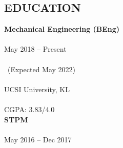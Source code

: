 \documentclass[11pt,A4,english]{article}
\begin{document}
\begin{paracol}{2}
\setlength{\columnsep}{2em}


\begin{leftcolumn}
    \vspace{0em}
    \section{EDUCATION}
        \vspace{0em}
        \begin{addmargin}[0em]{0em}

            {\bfseries Mechanical Engineering (BEng)} \\ \vspace{-.8cm} \\
    
            \hspace{-14pt} \faCalendar \hspace{6pt} May 2018 -- Present \\ \vspace{-.9cm} \\
    
            \hspace{2pt} \ (Expected May 2022) \\ \vspace{-.7cm} \\
    
            \hspace{-15pt} \faGraduationCap \hspace{2pt} UCSI University, KL \\ \vspace{-.7cm} \\
    
            \hspace{-13pt} \faTrophy \hspace{5pt} CGPA: 3.83/4.0 \\
    
            \hspace{-20pt} {\bfseries STPM } \\ \vspace{-.8cm} \\
    
            \hspace{-14pt} \faCalendar \hspace{6pt} May 2016 -- Dec 2017 \\ \vspace{-.7cm} \\
    

\end{addmargin}
\end{leftcolumn}
\end{paracol}
\end{document}

